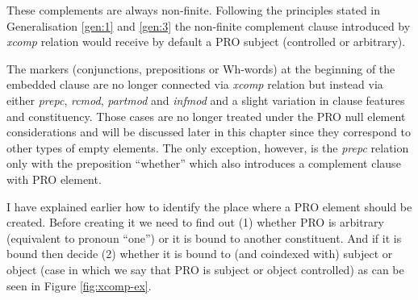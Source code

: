 These complements are always non-finite. Following the principles stated in Generalisation \ref{gen:1} and \ref{gen:3} the non-finite complement clause introduced by \textit{xcomp} relation would receive by default a PRO subject (controlled or arbitrary).

The markers (conjunctions, prepositions or Wh-words) at the beginning of the embedded clause are no longer connected via \textit{xcomp} relation but instead via either \textit{prepc}, \textit{rcmod}, \textit{partmod} and \textit{infmod} and a slight variation in clause features and constituency. Those cases are no longer treated under the PRO null element considerations and will be discussed later in this chapter since they correspond to other types of empty elements. The only exception, however, is the \textit{prepc} relation only with the preposition ``whether'' which also introduces a complement clause with PRO element.


I have explained earlier how to identify the place where a PRO element should be created. Before creating it we need to find out (1) whether PRO is arbitrary (equivalent to pronoun ``one'') or it is bound to another constituent. And if it is bound then decide (2) whether it is bound to (and coindexed with) subject or object (case in which we say that PRO is subject or object controlled) as can be seen in Figure \ref{fig:xcomp-ex}.


